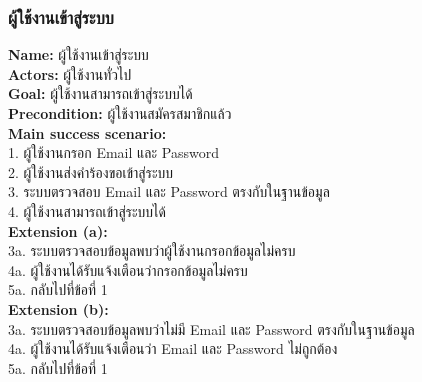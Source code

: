 \documentclass[12pt,oneside,openright,a4paper]{cpe-thai-project}
\begin{document}
\begin{itemize}
\subsubsection{ผู้ใช้งานเข้าสู่ระบบ}
\textbf{Name: }ผู้ใช้งานเข้าสู่ระบบ \\
\textbf{Actors: }ผู้ใช้งานทั่วไป \\
\textbf{Goal: }ผู้ใช้งานสามารถเข้าสู่ระบบได้ \\
\textbf{Precondition: }ผู้ใช้งานสมัครสมาชิกแล้ว \\
\textbf{Main success scenario: } \\
  \hspace*{0.5cm}1. ผู้ใช้งานกรอก Email และ Password \\
  \hspace*{0.5cm}2. ผู้ใช้งานส่งคำร้องขอเข้าสู่ระบบ \\
  \hspace*{0.5cm}3. ระบบตรวจสอบ Email และ Password ตรงกับในฐานข้อมูล \\
  \hspace*{0.5cm}4. ผู้ใช้งานสามารถเข้าสู่ระบบได้ \\ \newpage
\textbf{Extension (a): } \\ 
  \hspace*{0.5cm}3a. ระบบตรวจสอบข้อมูลพบว่าผู้ใช้งานกรอกข้อมูลไม่ครบ \\
  \hspace*{0.5cm}4a. ผู้ใช้งานได้รับแจ้งเตือนว่ากรอกข้อมูลไม่ครบ \\
  \hspace*{0.5cm}5a. กลับไปที่ข้อที่ 1 \\
\textbf{Extension (b): }  \\
  \hspace*{0.5cm}3a. ระบบตรวจสอบข้อมูลพบว่าไม่มี Email และ Password ตรงกับในฐานข้อมูล \\
  \hspace*{0.5cm}4a. ผู้ใช้งานได้รับแจ้งเตือนว่า Email และ Password ไม่ถูกต้อง \\
  \hspace*{0.5cm}5a. กลับไปที่ข้อที่ 1 
\begin{figure}[!ht]\centering

\end{figure}
\end{itemize}
\end{document}
